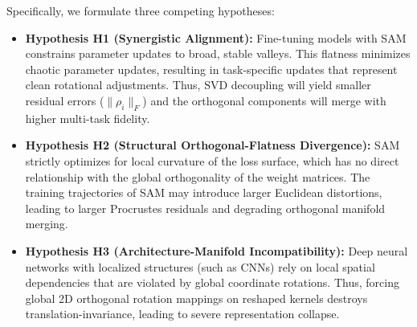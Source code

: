 \documentclass{article}
\begin{document}
Specifically, we formulate three competing hypotheses:
\begin{itemize}
    \item \textbf{Hypothesis H1 (Synergistic Alignment):} Fine-tuning models with SAM constrains parameter updates to broad, stable valleys. This flatness minimizes chaotic parameter updates, resulting in task-specific updates that represent clean rotational adjustments. Thus, SVD decoupling will yield smaller residual errors ($\|\rho_i\|_F$) and the orthogonal components will merge with higher multi-task fidelity.
    \item \textbf{Hypothesis H2 (Structural Orthogonal-Flatness Divergence):} SAM strictly optimizes for local curvature of the loss surface, which has no direct relationship with the global orthogonality of the weight matrices. The training trajectories of SAM may introduce larger Euclidean distortions, leading to larger Procrustes residuals and degrading orthogonal manifold merging.
    \item \textbf{Hypothesis H3 (Architecture-Manifold Incompatibility):} Deep neural networks with localized structures (such as CNNs) rely on local spatial dependencies that are violated by global coordinate rotations. Thus, forcing global 2D orthogonal rotation mappings on reshaped kernels destroys translation-invariance, leading to severe representation collapse.
\end{itemize}
\end{document}
